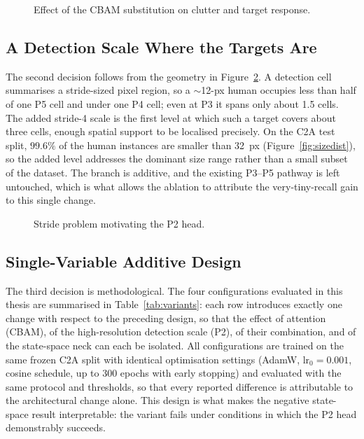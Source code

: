 \begin{figure}[tbp]
  \centering
  \caption{Effect of the CBAM substitution on clutter and target response.}
  \label{fig:cbameffect}
\end{figure}

\subsection{A Detection Scale Where the Targets Are}
\label{sec:p2novel}
The second decision follows from the geometry in Figure~\ref{fig:strideprob}. A
detection cell summarises a stride-sized pixel region, so a $\sim$12-px human
occupies less than half of one P5 cell and under one P4 cell; even at P3 it spans
only about 1.5 cells. The added stride-4 scale is the first level at which such a
target covers about three cells, enough spatial support to be localised
precisely. On the C2A test split, $99.6\%$ of the human instances are smaller
than 32~px (Figure~\ref{fig:sizedist}), so the added level addresses the
dominant size range rather than a small subset of the dataset. The
branch is additive, and the existing P3--P5 pathway is left untouched, which is
what allows the ablation to attribute the very-tiny-recall gain to this single
change.

\begin{figure}[tbp]
  \centering
  \caption{Stride problem motivating the P2 head.}
  \label{fig:strideprob}
\end{figure}

\subsection{Single-Variable Additive Design}
The third decision is methodological. The four configurations evaluated in this
thesis are summarised in Table~\ref{tab:variants}: each row introduces exactly
one change with respect to the preceding design, so that the effect of attention
(CBAM), of the high-resolution detection scale (P2), of their combination, and
of the state-space neck can each be isolated. All configurations are trained on
the same frozen C2A split with identical optimisation settings (AdamW,
$\text{lr}_0 = 0.001$, cosine schedule, up to 300 epochs with early stopping)
and evaluated with the same protocol and thresholds, so that every reported
difference is attributable to the architectural change alone. This design is
what makes the negative state-space result interpretable: the variant fails
under conditions in which the P2 head demonstrably succeeds.

